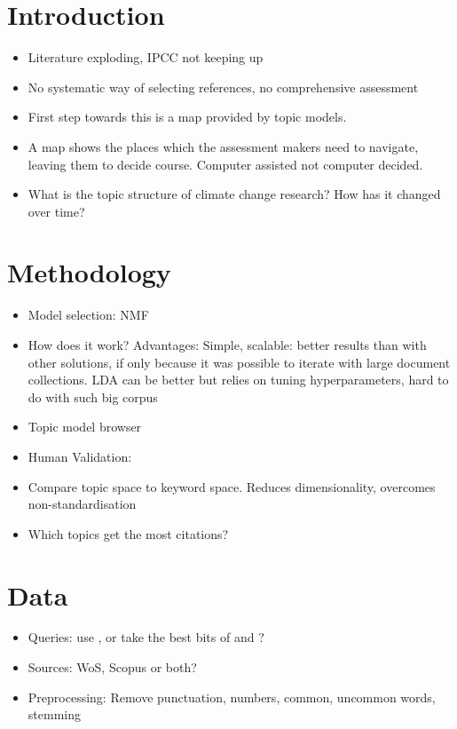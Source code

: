 \documentclass{article}
\begin{document}
\section{Introduction}
\begin{itemize}
	\item Literature exploding, IPCC not keeping up \citep{minx2016learning}
    \item No systematic way of selecting references, no comprehensive assessment
    \item First step towards this is a map provided by topic models. 
    \item A map shows the places which the assessment makers need to navigate, leaving them to decide course. Computer assisted not computer decided.
    \item What is the topic structure of climate change research? How has it changed over time?
\end{itemize}

\section{Methodology}

\begin{itemize}
\item Model selection: NMF \citep{Lee1999}
\item How does it work? Advantages: Simple, scalable: better results than with other solutions, if only because it was possible to iterate with large document collections. LDA can be better but relies on tuning hyperparameters, hard to do with such big corpus
\item Topic model browser \citet{Chaney2012}
\item Human Validation: 
\item Compare topic space to keyword space. Reduces dimensionality, overcomes non-standardisation
\item Which topics get the most citations?

\end{itemize}

\section{Data}
\begin{itemize}
	\item Queries: use \citet{Grieneisen2011}, or take the best bits of \citet{Grieneisen2011} and \citet{Haunschild2016}?
    \item Sources: WoS, Scopus or both?
    \item Preprocessing: Remove punctuation, numbers, common, uncommon words, stemming
\end{itemize}
\end{document}
